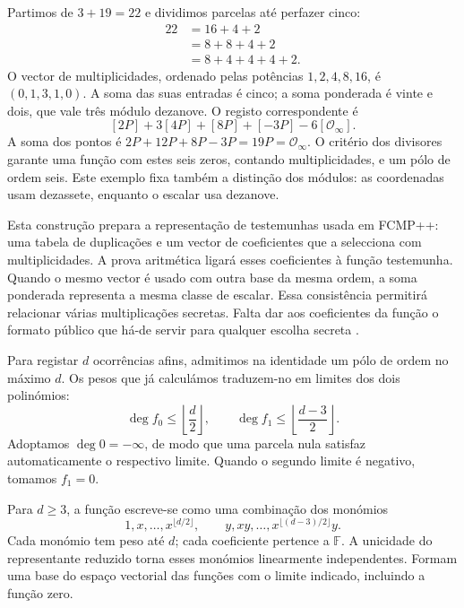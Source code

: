 Partimos de \(3+19=22\) e dividimos parcelas até perfazer cinco:
\begin{align*}
 22&=16+4+2\\
   &=8+8+4+2\\
   &=8+4+4+4+2.
\end{align*}
O vector de multiplicidades, ordenado pelas potências
\(1,2,4,8,16\), é \((0,1,3,1,0)\). A soma das suas entradas
é cinco; a soma ponderada é vinte e dois, que vale três módulo
dezanove.
O registo correspondente é
\[
 [2P]+3[4P]+[8P]+[-3P]-6[\mathcal O_\infty].
\]
A soma dos pontos é
\(2P+12P+8P-3P=19P=\mathcal O_\infty\). O critério dos
divisores garante uma função com estes seis zeros, contando
multiplicidades, e um pólo de ordem seis. Este exemplo fixa também a
distinção dos módulos: as coordenadas usam dezassete, enquanto o
escalar usa dezanove.

Esta construção prepara a representação de testemunhas usada em
FCMP++: uma tabela de duplicações e um vector de coeficientes que a
selecciona com multiplicidades. A prova aritmética ligará esses
coeficientes à função testemunha. Quando o mesmo vector é usado com
outra base da mesma ordem, a soma ponderada representa a mesma classe
de escalar. Essa consistência permitirá relacionar várias
multiplicações secretas. Falta dar aos coeficientes da função o formato público que há-de
servir para qualquer escolha secreta \cite{monero-oxide-fcmp-source}.


Para registar \(d\) ocorrências afins, admitimos na identidade
um pólo de ordem no máximo \(d\).
Os pesos que já calculámos traduzem-no em limites dos dois polinómios:
\begin{equation}
 \deg f_0\leq\left\lfloor\frac d2\right\rfloor,
 \qquad
 \deg f_1\leq\left\lfloor\frac{d-3}{2}\right\rfloor.
 \label{eq:divisors-coefficient-bounds}
\end{equation}
Adoptamos \(\deg0=-\infty\), de modo que uma parcela nula satisfaz
automaticamente o respectivo limite. Quando o segundo limite é
negativo, tomamos \(f_1=0\).

Para \(d\geq3\), a função escreve-se como uma combinação dos monómios
\[
 1,x,\ldots,x^{\lfloor d/2\rfloor},
 \qquad y,xy,\ldots,x^{\lfloor(d-3)/2\rfloor}y.
\]
Cada monómio tem peso até \(d\); cada coeficiente pertence a
\(\mathbb F\). A unicidade do representante reduzido torna esses
monómios linearmente independentes. Formam uma base do espaço
vectorial das funções com o limite indicado, incluindo a função zero.

